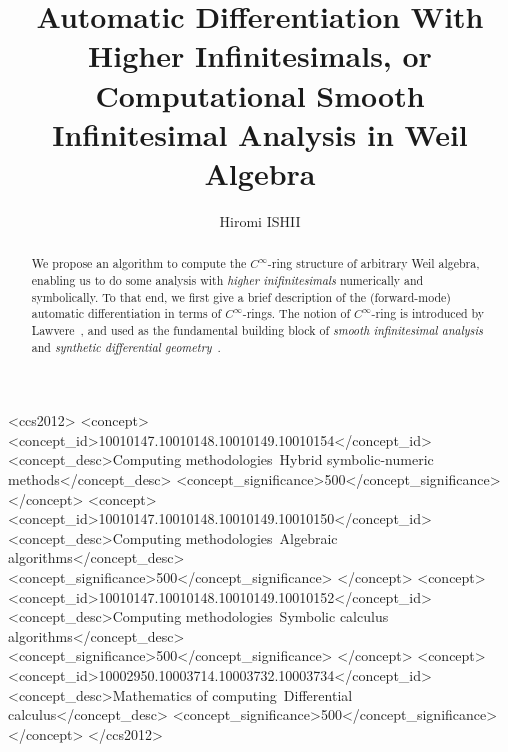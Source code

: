 \documentclass[%
  sigconf,authorversion,screen]{acmart}
\begin{document}
\title[Automatic Differentiation With Higher Infinitesimals]{Automatic Differentiation With Higher Infinitesimals, or Computational Smooth Infinitesimal Analysis in Weil Algebra}

\author{Hiromi ISHII}

\renewcommand{\shortauthors}{Hiromi ISHII}

\begin{abstract}
  \frenchspacing
  We propose an algorithm to compute the $C^\infty$-ring structure of arbitrary Weil algebra, enabling us to do some analysis with \emph{higher inifinitesimals} numerically and symbolically.
  To that end, we first give a brief description of the (forward-mode) automatic differentiation in terms of $C^\infty$-rings.
  The notion of $C^\infty$-ring is introduced by Lawvere~\cite{lawvere1979categorical}, and used as the fundamental building block of \emph{smooth infinitesimal analysis} and \emph{synthetic differential geometry}~\cite{Moerdijk:1991aa}.
\end{abstract}

\begin{CCSXML}
<ccs2012>
    <concept>
        <concept_id>10010147.10010148.10010149.10010154</concept_id>
        <concept_desc>Computing methodologies~Hybrid symbolic-numeric methods</concept_desc>
        <concept_significance>500</concept_significance>
        </concept>
    <concept>
        <concept_id>10010147.10010148.10010149.10010150</concept_id>
        <concept_desc>Computing methodologies~Algebraic algorithms</concept_desc>
        <concept_significance>500</concept_significance>
        </concept>
    <concept>
        <concept_id>10010147.10010148.10010149.10010152</concept_id>
        <concept_desc>Computing methodologies~Symbolic calculus algorithms</concept_desc>
        <concept_significance>500</concept_significance>
        </concept>
    <concept>
        <concept_id>10002950.10003714.10003732.10003734</concept_id>
        <concept_desc>Mathematics of computing~Differential calculus</concept_desc>
        <concept_significance>500</concept_significance>
        </concept>
  </ccs2012>
\end{CCSXML}

  
\end{document}
